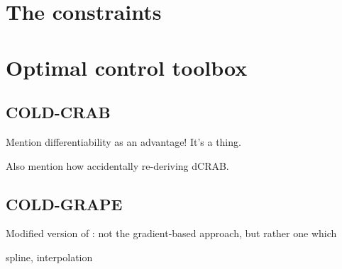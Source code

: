 \section{The constraints}

\section{Optimal control toolbox}

\subsection{COLD-CRAB}

Mention differentiability as an advantage! It's a thing.

Also mention how accidentally re-deriving dCRAB.

\subsection{COLD-GRAPE}

Modified version of : not the gradient-based approach, but rather one which 

spline, interpolation